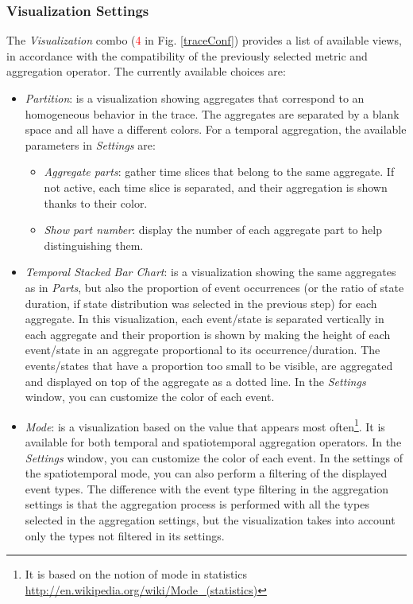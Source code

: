 \documentclass[twoside]{article}
\begin{document}
\begin{sloppypar}
\subsubsection{Visualization Settings}
\label{visuop}
The \textit{Visualization} combo (\textcolor{red}{4} in Fig. \ref{traceConf}) provides a list of available views, in accordance with the compatibility of the previously selected metric and aggregation operator. The currently available choices are:
\begin{itemize}
	\item \textit{Partition}: is a visualization showing aggregates that correspond to an homogeneous behavior in the trace. The aggregates are separated by a blank space and all have a different colors. For a temporal aggregation, the available parameters in \textit{Settings} are:
	\begin{itemize}
		\item \textit{Aggregate parts}: gather time slices that belong to the same aggregate. If not active, each time slice is separated, and their aggregation is shown thanks to their color.
		\item \textit{Show part number}: display the number of each aggregate part to help distinguishing them.
	\end{itemize}
	\item \textit{Temporal Stacked Bar Chart}: is a visualization showing the same aggregates as in \textit{Parts}, but also the proportion of event occurrences (or the ratio of state duration, if state distribution was selected in the previous step) for each aggregate. In this visualization, each event/state is separated vertically in each aggregate and their proportion is shown by making the height of each event/state in an aggregate proportional to its occurrence/duration. The events/states that have a proportion too small to be visible, are aggregated and displayed on top of the aggregate as a dotted line. In the \textit{Settings} window, you can customize the color of each event.
	\item \textit{Mode}: is a visualization based on the value that appears most often\footnote{It is based on the notion of mode in statistics \url{http://en.wikipedia.org/wiki/Mode_(statistics)}}. It is available for both temporal and spatiotemporal aggregation operators. In the \textit{Settings} window, you can customize the color of each event. In the settings of the spatiotemporal mode, you can also perform a filtering of the displayed event types. The difference with the event type filtering in the aggregation settings is that the aggregation process is performed with all the types selected in the aggregation settings, but the visualization takes into account only the types not filtered in its settings. 
\end{itemize}


\end{sloppypar}
\end{document}
